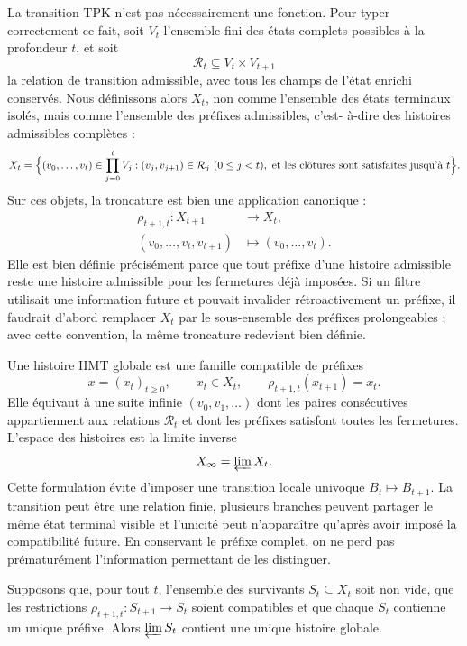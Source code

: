 La transition TPK n'est pas nécessairement une fonction. Pour typer correctement
ce fait, soit \(V_t\) l'ensemble fini des états complets possibles à
la profondeur \(t\), et soit
\[
\mathcal R_t\subseteq V_t\times V_{t+1}
\]
la relation de transition admissible, avec tous les champs de l'état
enrichi conservés. Nous définissons alors \(X_t\), non comme l'ensemble des
états terminaux isolés, mais comme l'ensemble des préfixes admissibles, c'est-
à-dire des histoires admissibles complètes :
\[
X_t=
\Bigl\{
(v_0,\ldots,v_t)\in\prod_{j=0}^{t}V_j:
(v_j,v_{j+1})\in\mathcal R_j\ (0\le j<t),
\ \text{et les clôtures sont satisfaites jusqu’à }t
\Bigr\}.
\]
Sur ces objets, la troncature est bien une application canonique :
\[
\begin{aligned}
\rho_{t+1,t}:X_{t+1}&\longrightarrow X_t,\\
(v_0,\ldots,v_t,v_{t+1})&\longmapsto(v_0,\ldots,v_t).
\end{aligned}
\]
Elle est bien définie précisément parce que tout préfixe d'une histoire
admissible reste une histoire admissible pour les fermetures déjà imposées.
Si un filtre utilisait une information future et pouvait invalider
rétroactivement un préfixe, il faudrait d'abord remplacer \(X_t\) par le
sous-ensemble des préfixes prolongeables ; avec cette convention, la même troncature
redevient bien définie.

Une histoire HMT globale est une famille compatible de préfixes
\[
x=(x_t)_{t\ge0},
\qquad
x_t\in X_t,
\qquad
\rho_{t+1,t}(x_{t+1})=x_t.
\]
Elle équivaut à une suite infinie \((v_0,v_1,\ldots)\) dont les paires
consécutives appartiennent aux relations \(\mathcal R_t\) et dont les préfixes
satisfont toutes les fermetures. L'espace des histoires est la limite inverse
\[
X_\infty=\varprojlim X_t.
\]
Cette formulation évite d'imposer une transition locale univoque
\(B_t\mapsto B_{t+1}\). La transition peut être une relation finie, plusieurs
branches peuvent partager le même état terminal visible et l'unicité peut
n'apparaître qu'après avoir imposé la compatibilité future. En conservant le
préfixe complet, on ne perd pas prématurément l'information permettant
de les distinguer.

\begin{theorem}
Supposons que, pour tout \(t\), l'ensemble des survivants \(S_t\subseteq
X_t\) soit non vide, que les restrictions
\(\rho_{t+1,t}:S_{t+1}\to S_t\) soient compatibles et que chaque \(S_t\) contienne un
unique préfixe. Alors \(\varprojlim S_t\) contient une unique histoire
globale.
\end{theorem}

